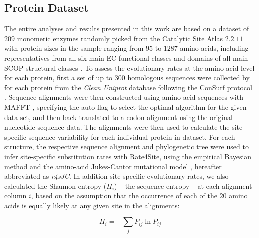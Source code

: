 \documentclass[11pt]{article}
\begin{document}
    \subsection*{Protein Dataset}

        The entire analyses and results presented in this work are based on a dataset of $209$ monomeric enzymes \citep[e.g.,][]{yeh_site-specific_2014, echave_relationship_2014} randomly picked from the Catalytic Site Atlas $2.2.11$ \citep[][]{porter_catalytic_2004} with protein sizes in the sample ranging from $95$ to $1287$ amino acids, including representatives from all six main EC functional classes \citep[][]{webb_enzyme_1992} and domains of all main SCOP structural classes \citep[][]{murzin_scop:_1995}. To assess the evolutionary rates at the amino acid level for each protein, first a set of up to $300$ homologous sequences were collected by \citet{yeh_site-specific_2014} for each protein from the {\it Clean Uniprot} database following the ConSurf protocol \citep[][]{goldenberg_consurf-db:_2009, ashkenazy_consurf_2010}. Sequence alignments were then constructed using amino-acid sequences with MAFFT \citep[][]{katoh_mafft_2005}, specifying the auto flag to select the optimal algorithm for the given data set, and then back-translated to a codon alignment using the original nucleotide sequence data. The alignments were then used to calculate the site-specific sequence variability for each individual protein in dataset. For each structure, the respective sequence alignment and phylogenetic tree were used to infer site-specific substitution rates with Rate4Site, using the empirical Bayesian method and the amino-acid Jukes-Cantor mutational model \citep[][]{mayrose_comparison_2004}, hereafter abbreviated as {\it r4sJC}.
        In addition site-specific evolutionary rates, we also calculated the Shannon entropy ($H_i$) -- the sequence entropy \citep[][]{shenkin_information-theoretical_1991} -- at each alignment column $i$, based on the assumption that the occurrence of each of the $20$ amino acids is equally likely at any given site in the alignments:

        \begin{equation}
            \label{eqn:shannon}
            H_i = -\sum_j P_{ij}\ln P_{ij}
        \end{equation}
\end{document}
